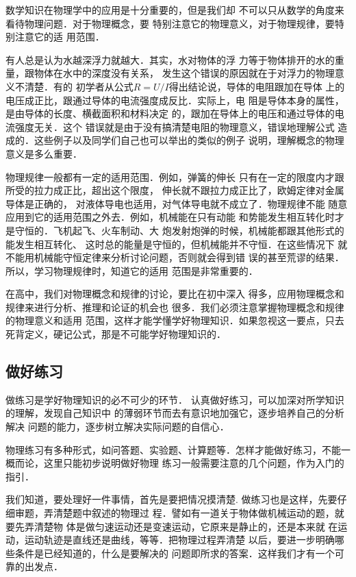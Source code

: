     数学知识在物理学中的应用是十分重要的，但是我们却
不可以只从数学的角度来看待物理问题．对于物理概念，要
特别注意它的物理意义，对于物理规律，要特别注意它的适
用范围．

    有人总是认为水越深浮力就越大．其实，水对物体的浮
力等于物体排开的水的重量，跟物体在水中的深度没有关系，
发生这个错误的原因就在于对浮力的物理意义不清楚．有的
初学者从公式$R=U/I$得出结论说，导体的电阻跟加在导体
上的电压成正比，跟通过导体的电流强度成反比．实际上，电
阻是导体本身的属性，是由导体的长度、横截面积和材料决定
的，跟加在导体上的电压和通过导体的电流强度无关．这个
错误就是由于没有搞清楚电阻的物理意义，错误地理解公式
造成的．这些例子以及同学们自己也可以举出的类似的例子
说明，理解概念的物理意义是多么重要．

    物理规律一般都有一定的适用范围．例如，弹簧的伸长
只有在一定的限度内才跟所受的拉力成正比，超出这个限度，
伸长就不跟拉力成正比了，欧姆定律对金属导体是正确的，
对液体导电也适用，对气体导电就不成立了．物理规律不能
随意应用到它的适用范围之外去．例如，机械能在只有动能
和势能发生相互转化时才是守恒的．飞机起飞、火车制动、大
炮发射炮弹的时候，机械能都跟其他形式的能发生相互转化、
这时总的能量是守恒的，但机械能并不守恒．在这些情况下
就不能用机械能守恒定律来分析讨论问题，否则就会得到错
误的甚至荒谬的结果．所以，学习物理规律时，知道它的适用
范围是非常重要的．

    在高中，我们对物理概念和规律的讨论，要比在初中深入
得多，应用物理概念和规律来进行分析、推理和论证的机会也
很多．我们必须注意掌握物理概念和规律的物理意义和适用
范围，这样才能学懂学好物理知识．如果忽视这一要点，只去
死背定义，硬记公式，那是不可能学好物理知识的．


\subsection*{做好练习}

做练习是学好物理知识的必不可少的环节．
认真做好练习，可以加深对所学知识的理解，发现自己知识中
的薄弱环节而去有意识地加强它，逐步培养自己的分析解决
问题的能力，逐步树立解决实际问题的自信心．

物理练习有多种形式，如问答题、实验题、计算题等．怎样才能做好练习，不能一概而论，这里只能初步说明做好物理
练习一般需要注意的几个问题，作为入门的指引．

    我们知道，要处理好一件事情，首先是要把情况摸清楚.
做练习也是这样，先要仔细审题，弄清楚题中叙述的物理过
程．譬如有一道关于物体做机械运动的题，就要先弄清楚物
体是做匀速运动还是变速运动，它原来是静止的，还是本来就
在运动，运动轨迹是直线还是曲线，等等．把物理过程弄清楚
以后，要进一步明确哪些条件是已经知道的，什么是要解决的
问题即所求的答案．这样我们才有一个可靠的出发点．

